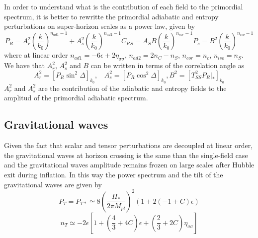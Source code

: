 \documentclass[amssymb,twocolumn,prd,nofootinbib,showpacs]{revtex4-1}
\begin{document}
In order to understand what is the contribution of each field to the primordial spectrum, it is better to rewritte the primordial adiabatic and entropy perturbations on super-horizon scales as a power law, given by
\begin{subequations}\label{PswAs}
\begin{equation}\label{PrAs}
P_R=A_r^2\left(\frac{k}{k_0}\right)^{n_{ad1}-1}+A_s^2\left(\frac{k}{k_0}\right)^{n_{ad2}-1}
\end{equation}
\begin{equation}\label{PrCrs}
C_{RS}=A_SB\left(\frac{k}{k_0}\right)^{n_{cor}-1}
\end{equation}
\begin{equation}\label{PsAs}
P_s=B^2\left(\frac{k}{k_0}\right)^{n_{iso}-1}
\end{equation}
\end{subequations}
where at linear order $n_{ad1}=-6\epsilon+2\eta_{\sigma\sigma}$, $n_{ad2}=2n_C-n_S$, $n_{cor}=n_c$, $n_{iso}=n_S$. We have that $A_r^2$, $A_s^2$ and $B$ can be written in terms of the correlation angle as
\begin{subequations}
\label{RelAs}
\begin{equation}
A_r^2=[P_R\sin^2\Delta]_{k_0}, \ \ \ \ A_s^2=[P_R\cos^2\Delta]_{k_0},
\end{equation}
\begin{equation}
B^2=[T_{SS}^2 P_R|_*]_{k_0}
\end{equation}
\end{subequations}
$A_r^2$ and $A_s^2$ are the contribution of the adiabatic and entropy fields to the amplitud of the primordial adiabatic spectrum. 
\subsection{Gravitational waves}

Given the fact that scalar and tensor perturbations are decoupled at linear order, the gravitational waves at horizon crossing is the same than the single-field case and the gravitational waves amplitude remains frozen on large scales after Hubble exit during inflation. In this way the power spectrum and the tilt of the gravitational waves are given by
\begin{equation}
P_T=P_{T*}\simeq 8 \left(\frac{H_*}{2\pi M_{pl}}\right)^2(1+2(-1+C)\epsilon)
\end{equation}
\begin{equation}\label{tiltsnt}
n_T\simeq -2\epsilon\left[1+\left(\frac{4}{3}+4C\right)\epsilon+\left(\frac{2}{3}+2C\right)\eta_{\sigma\sigma}\right]
\end{equation}
\end{document}
